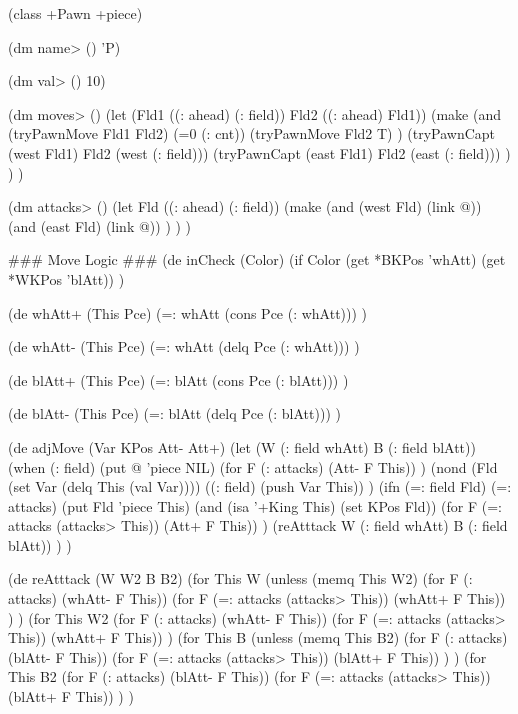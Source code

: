 \begin{wideverbatim}
 
 
(class +Pawn +piece)
 
(dm name> () 'P)
 
(dm val> () 10)
 
(dm moves> ()
   (let (Fld1 ((: ahead) (: field))  Fld2 ((: ahead) Fld1))
      (make
         (and
            (tryPawnMove Fld1 Fld2)
            (=0 (: cnt))
            (tryPawnMove Fld2 T) )
         (tryPawnCapt (west Fld1) Fld2 (west (: field)))
         (tryPawnCapt (east Fld1) Fld2 (east (: field))) ) ) )
 
(dm attacks> ()
   (let Fld ((: ahead) (: field))
      (make
         (and (west Fld) (link @))
         (and (east Fld) (link @)) ) ) )
 

\end{wideverbatim}

\begin{wideverbatim}
 
### Move Logic ###
(de inCheck (Color)
   (if Color (get *BKPos 'whAtt) (get *WKPos 'blAtt)) )
 
(de whAtt+ (This Pce)
   (=: whAtt (cons Pce (: whAtt))) )
 
(de whAtt- (This Pce)
   (=: whAtt (delq Pce (: whAtt))) )
 
(de blAtt+ (This Pce)
   (=: blAtt (cons Pce (: blAtt))) )
 
(de blAtt- (This Pce)
   (=: blAtt (delq Pce (: blAtt))) )
 
(de adjMove (Var KPos Att- Att+)
   (let (W (: field whAtt)  B (: field blAtt))
      (when (: field)
         (put @ 'piece NIL)
         (for F (: attacks) (Att- F This)) )
      (nond
         (Fld (set Var (delq This (val Var))))
         ((: field) (push Var This)) )
      (ifn (=: field Fld)
         (=: attacks)
         (put Fld 'piece This)
         (and (isa '+King This) (set KPos Fld))
         (for F (=: attacks (attacks> This)) (Att+ F This)) )
      (reAtttack W (: field whAtt) B (: field blAtt)) ) )
 
(de reAtttack (W W2 B B2)
   (for This W
      (unless (memq This W2)
         (for F (: attacks) (whAtt- F This))
         (for F (=: attacks (attacks> This)) (whAtt+ F This)) ) )
   (for This W2
      (for F (: attacks) (whAtt- F This))
      (for F (=: attacks (attacks> This)) (whAtt+ F This)) )
   (for This B
      (unless (memq This B2)
         (for F (: attacks) (blAtt- F This))
         (for F (=: attacks (attacks> This)) (blAtt+ F This)) ) )
   (for This B2
      (for F (: attacks) (blAtt- F This))
      (for F (=: attacks (attacks> This)) (blAtt+ F This)) ) )


\end{wideverbatim}

